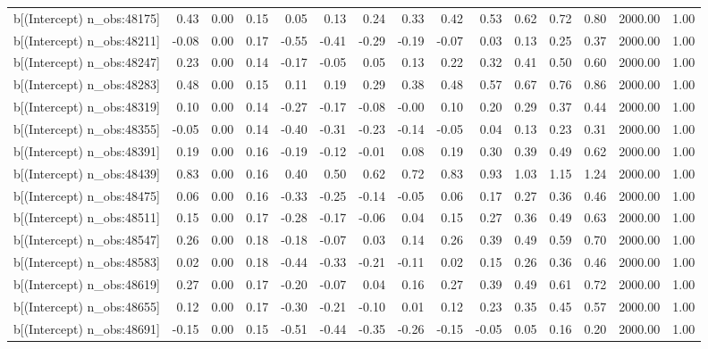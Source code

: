 \begin{table}[ht]
\begin{tabular}{rrrrrrrrrrrrrrr}
  b[(Intercept) n\_obs:48175] & 0.43 & 0.00 & 0.15 & 0.05 & 0.13 & 0.24 & 0.33 & 0.42 & 0.53 & 0.62 & 0.72 & 0.80 & 2000.00 & 1.00 \\ 
  b[(Intercept) n\_obs:48211] & -0.08 & 0.00 & 0.17 & -0.55 & -0.41 & -0.29 & -0.19 & -0.07 & 0.03 & 0.13 & 0.25 & 0.37 & 2000.00 & 1.00 \\ 
  b[(Intercept) n\_obs:48247] & 0.23 & 0.00 & 0.14 & -0.17 & -0.05 & 0.05 & 0.13 & 0.22 & 0.32 & 0.41 & 0.50 & 0.60 & 2000.00 & 1.00 \\ 
  b[(Intercept) n\_obs:48283] & 0.48 & 0.00 & 0.15 & 0.11 & 0.19 & 0.29 & 0.38 & 0.48 & 0.57 & 0.67 & 0.76 & 0.86 & 2000.00 & 1.00 \\ 
  b[(Intercept) n\_obs:48319] & 0.10 & 0.00 & 0.14 & -0.27 & -0.17 & -0.08 & -0.00 & 0.10 & 0.20 & 0.29 & 0.37 & 0.44 & 2000.00 & 1.00 \\ 
  b[(Intercept) n\_obs:48355] & -0.05 & 0.00 & 0.14 & -0.40 & -0.31 & -0.23 & -0.14 & -0.05 & 0.04 & 0.13 & 0.23 & 0.31 & 2000.00 & 1.00 \\ 
  b[(Intercept) n\_obs:48391] & 0.19 & 0.00 & 0.16 & -0.19 & -0.12 & -0.01 & 0.08 & 0.19 & 0.30 & 0.39 & 0.49 & 0.62 & 2000.00 & 1.00 \\ 
  b[(Intercept) n\_obs:48439] & 0.83 & 0.00 & 0.16 & 0.40 & 0.50 & 0.62 & 0.72 & 0.83 & 0.93 & 1.03 & 1.15 & 1.24 & 2000.00 & 1.00 \\ 
  b[(Intercept) n\_obs:48475] & 0.06 & 0.00 & 0.16 & -0.33 & -0.25 & -0.14 & -0.05 & 0.06 & 0.17 & 0.27 & 0.36 & 0.46 & 2000.00 & 1.00 \\ 
  b[(Intercept) n\_obs:48511] & 0.15 & 0.00 & 0.17 & -0.28 & -0.17 & -0.06 & 0.04 & 0.15 & 0.27 & 0.36 & 0.49 & 0.63 & 2000.00 & 1.00 \\ 
  b[(Intercept) n\_obs:48547] & 0.26 & 0.00 & 0.18 & -0.18 & -0.07 & 0.03 & 0.14 & 0.26 & 0.39 & 0.49 & 0.59 & 0.70 & 2000.00 & 1.00 \\ 
  b[(Intercept) n\_obs:48583] & 0.02 & 0.00 & 0.18 & -0.44 & -0.33 & -0.21 & -0.11 & 0.02 & 0.15 & 0.26 & 0.36 & 0.46 & 2000.00 & 1.00 \\ 
  b[(Intercept) n\_obs:48619] & 0.27 & 0.00 & 0.17 & -0.20 & -0.07 & 0.04 & 0.16 & 0.27 & 0.39 & 0.49 & 0.61 & 0.72 & 2000.00 & 1.00 \\ 
  b[(Intercept) n\_obs:48655] & 0.12 & 0.00 & 0.17 & -0.30 & -0.21 & -0.10 & 0.01 & 0.12 & 0.23 & 0.35 & 0.45 & 0.57 & 2000.00 & 1.00 \\ 
  b[(Intercept) n\_obs:48691] & -0.15 & 0.00 & 0.15 & -0.51 & -0.44 & -0.35 & -0.26 & -0.15 & -0.05 & 0.05 & 0.16 & 0.20 & 2000.00 & 1.00 \\ 

\end{tabular}
\end{table}
